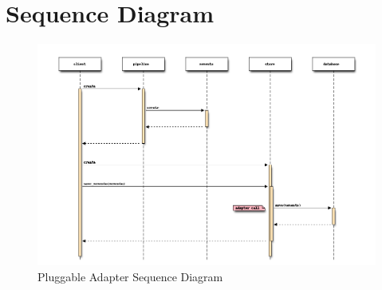    \section{Sequence Diagram}
	   \begin{figure}[H]
	   	\includegraphics[width = 1.2\linewidth]{diagrams/sequence_diagram.png}
	   	\caption{Pluggable Adapter Sequence Diagram}
	   \end{figure}

